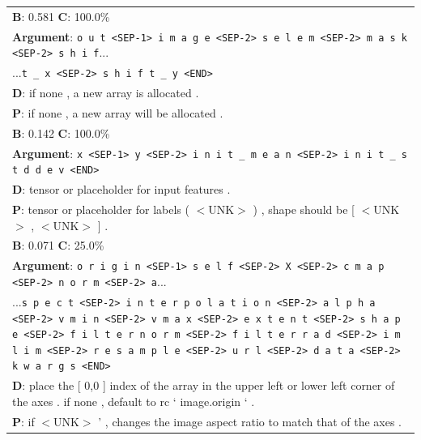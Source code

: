 \begin{table}
\begin{center}
\begin{tabular}{l}
\textbf{B}: 0.581
\textbf{C}: 100.0\%  \\
\textbf{Argument}: \texttt{o u t <SEP-1> i m a g e <SEP-2> s e l e m <SEP-2> m a s k <SEP-2> s h i f}...\\
...\texttt{t _ x <SEP-2> s h i f t _ y <END>}\\
\textbf{D}: if none , a new array is allocated .\\
\textbf{P}: if none , a new array will be allocated . \\

\textbf{B}: 0.142
\textbf{C}: 100.0\%  \\
\textbf{Argument}: \texttt{x <SEP-1> y <SEP-2> i n i t _ m e a n <SEP-2> i n i t _ s t d d e v <END>}\\
\textbf{D}: tensor or placeholder for input features .\\
\textbf{P}: tensor or placeholder for labels ( $<$UNK$>$ ) , shape should be [ $<$UNK$>$ , $<$UNK$>$ ] . \\

\textbf{B}: 0.071
\textbf{C}: 25.0\%  \\
\textbf{Argument}: \texttt{o r i g i n <SEP-1> s e l f <SEP-2> X <SEP-2> c m a p <SEP-2> n o r m <SEP-2> a}...\\
...\texttt{s p e c t <SEP-2> i n t e r p o l a t i o n <SEP-2> a l p h a <SEP-2> v m i n <SEP-2> v m a x <SEP-2> e x t e n t <SEP-2> s h a p e <SEP-2> f i l t e r n o r m <SEP-2> f i l t e r r a d <SEP-2> i m l i m <SEP-2> r e s a m p l e <SEP-2> u r l <SEP-2> d a t a <SEP-2> k w a r g s <END>}\\
\textbf{D}: place the [ 0,0 ] index of the array in the upper left or lower left corner of the axes . if none , default to rc ` image.origin ` .\\
\textbf{P}: if $<$UNK$>$ ' , changes the image aspect ratio to match that of the axes . \\

\end{tabular}
\end{center}
\end{table}
